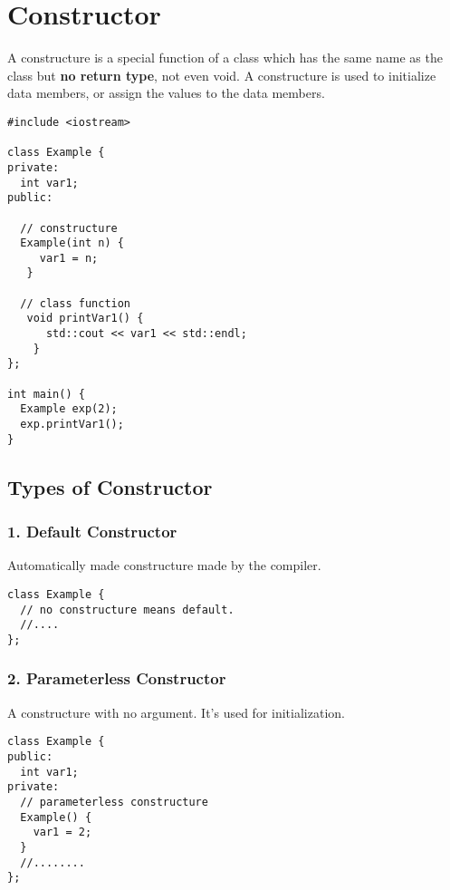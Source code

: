 \documentclass[11pt]{article}
\author{ok}
\date{\today}
\title{}
\begin{document}
\tableofcontents

\section{Constructor}
\label{sec:orgf41e696}
A constructure is a special function of a class which has the same name as the class but \textbf{no return type}, not even void.
A constructure is used to initialize data members, or assign the values to the data members.
\begin{verbatim}
#include <iostream>

class Example {
private:
  int var1;
public:

  // constructure
  Example(int n) {
     var1 = n;
   }

  // class function
   void printVar1() {
      std::cout << var1 << std::endl;
    }
};

int main() {
  Example exp(2);
  exp.printVar1();
}
\end{verbatim}
\subsection{Types of Constructor}
\label{sec:org50e0083}
\subsubsection{1. Default Constructor}
\label{sec:orgfa1001e}
Automatically made constructure made by the compiler.
\begin{verbatim}
class Example {
  // no constructure means default.
  //....
};
\end{verbatim}
\subsubsection{2. Parameterless Constructor}
\label{sec:org9223256}
A constructure with no argument. It's used for initialization.
\begin{verbatim}
class Example {
public:
  int var1;
private:
  // parameterless constructure
  Example() {
    var1 = 2;
  }
  //........
};
\end{verbatim}
\end{document}
